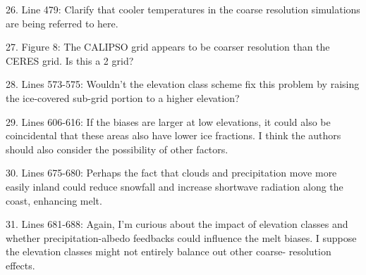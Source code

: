 \documentclass[12pt,oneside,a4paper]{article}%
\begin{document}
{\color{blue}{See above comment.}} \newline

26. Line 479: Clarify that cooler temperatures in the coarse resolution simulations are being referred to here. \newline

{\color{blue}{Decided to leave it as.}} \newline

27. Figure 8: The CALIPSO grid appears to be coarser resolution than the CERES grid. Is this a 2 grid? \newline

{\color{blue}{Yes, CALIPSO is on a 2 degree grid. Corrected Table 2. Great catch!}} \newline

28. Lines 573-575: Wouldn’t the elevation class scheme fix this problem by raising the ice-covered sub-grid portion to a higher elevation? \newline

{\color{blue}{That's a good point that we overlooked. We have added a sentence to the end of the next paragraph clarifying that differences between the grid cell mean and actual ice surface are not necessarily problematic due to the EC scheme.}} \newline

29. Lines 606-616: If the biases are larger at low elevations, it could also be coincidental that these areas also have lower ice fractions. I think the authors should also consider the possibility of other factors. \newline

{\color{blue}{We have added a caveat to the conclusions, that our hypothesis needs more testing.}} \newline

30. Lines 675-680: Perhaps the fact that clouds and precipitation move more easily inland could reduce snowfall and increase shortwave radiation along the coast, enhancing melt. \newline

{\color{blue}{See response to general remarks.}} \newline

31. Lines 681-688: Again, I’m curious about the impact of elevation classes and whether precipitation-albedo feedbacks could influence the melt biases. I suppose the elevation classes might not entirely balance out other coarse- resolution effects. \newline
\end{document}
